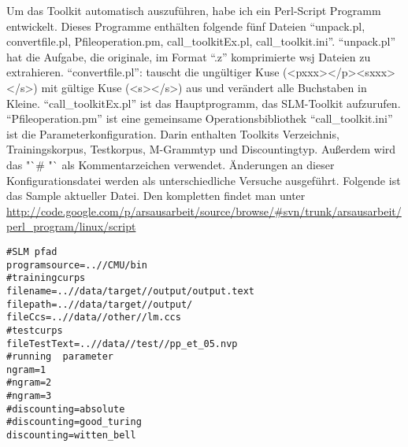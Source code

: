
Um das Toolkit automatisch auszuf\"uhren, habe ich ein Perl-Script Programm entwickelt. 
Dieses Programme enth\"alten folgende f\"unf Dateien "`unpack.pl, convertfile.pl, Pfileoperation.pm, call\_toolkitEx.pl, call\_toolkit.ini"'.
"`unpack.pl"' hat die Aufgabe, die originale, im Format "`.z"' komprimierte  wsj Dateien zu extrahieren.
"`convertfile.pl"': tauscht die ung\"ultiger Kuse (<pxxx></p><sxxx></s>) mit g\"ultige Kuse (<s></s>) aus und ver\"andert alle Buchstaben in Kleine. 
"`call\_toolkitEx.pl"' ist das Hauptprogramm, das SLM-Toolkit aufzurufen. 
"`Pfileoperation.pm"' ist eine gemeinsame Operationsbibliothek
"`call\_toolkit.ini"' ist die Parameterkonfiguration. Darin enthalten Toolkits Verzeichnis, Trainingskorpus, Testkorpus, M-Grammtyp und Discountingtyp. Au\ss erdem wird das "`\# "`  als Kommentarzeichen verwendet. \"Anderungen an dieser Konfigurationsdatei werden als unterschiedliche Versuche ausgef\"uhrt. Folgende ist das Sample aktueller Datei. Den kompletten findet man unter \url{http://code.google.com/p/arsausarbeit/source/browse/#svn/trunk/arsausarbeit/perl_program/linux/script}\\

\begin{lstlisting}
#SLM pfad 
programsource=..//CMU/bin 
#trainingcurps 
filename=..//data/target//output/output.text 
filepath=..//data/target//output/ 
fileCcs=..//data//other//lm.ccs 
#testcurps 
fileTestText=..//data//test//pp_et_05.nvp 
#running  parameter 
ngram=1 
#ngram=2 
#ngram=3 
#discounting=absolute 
#discounting=good_turing 
discounting=witten_bell 

\end{lstlisting}
